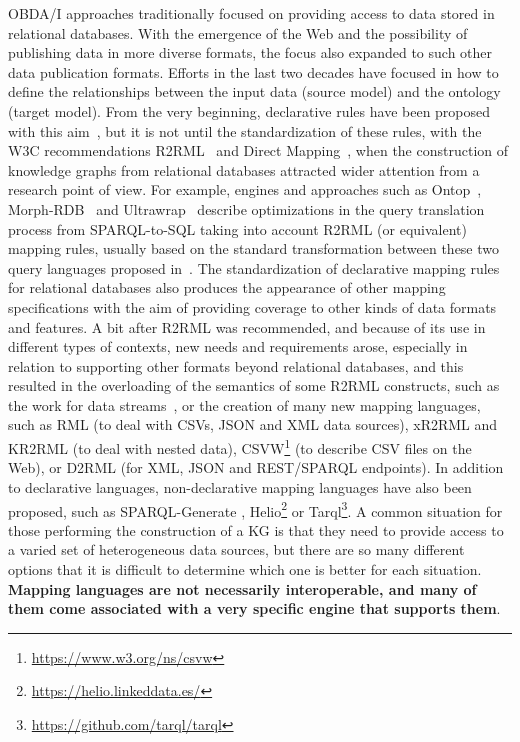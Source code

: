 OBDA/I approaches traditionally focused on providing access to data stored in relational databases. With the emergence of the Web and the possibility of publishing data in more diverse formats, the focus also expanded to such other data publication formats. Efforts in the last two decades have focused in how to define the relationships between the input data (source model) and the ontology (target model). From the very beginning, declarative rules have been proposed with this aim~\citep{barrasa2004r2o,bizer2004d2rq,auer2009triplify}, but it is not until the standardization of these rules, with the W3C recommendations R2RML~\citep{R2RML} and Direct Mapping~\citep{arenas2013direct}, when the construction of knowledge graphs from relational databases attracted wider attention from a research point of view. For example, engines and approaches such as Ontop~\citep{calvanese2017ontop}, Morph-RDB~\citep{priyatna2014formalisation} and Ultrawrap~\citep{sequeda2013ultrawrap} describe optimizations in the query translation process from SPARQL-to-SQL taking into account R2RML (or equivalent) mapping rules, usually based on the standard transformation between these two query languages proposed in~\citep{chebotko2009semantics, elliott2009complete}. The standardization of declarative mapping rules for relational databases also produces the appearance of other mapping specifications with the aim of providing coverage to other kinds of data formats and features. A bit after R2RML was recommended, and because of its use in different types of contexts, new needs and requirements arose, especially in relation to supporting other formats beyond relational databases, and this resulted in the overloading of the semantics of some R2RML constructs, such as the work for data streams~\citep{calbimonte2010enabling}, or the creation of many new mapping languages, such as RML \citep{dimou2014rml} (to deal with CSVs, JSON and XML data sources), xR2RML \citep{michel2015translation} and  KR2RML \citep{slepicka2015kr2rml} (to deal with nested data), CSVW\footnote{\url{https://www.w3.org/ns/csvw}} (to describe CSV files on the Web), or D2RML \citep{chortaras2018d2rml} (for XML, JSON and REST/SPARQL endpoints). In addition to declarative languages, non-declarative mapping languages have also been proposed, such as SPARQL-Generate \citep{lefranccois2017sparql}, Helio\footnote{\url{https://helio.linkeddata.es/}} or  Tarql\footnote{\url{https://github.com/tarql/tarql}}. A common situation for those performing the construction of a KG is that they need to provide access to a varied set of heterogeneous data sources, but there are so many different options that it is difficult to determine which one is better for each situation. \textbf{Mapping languages are not necessarily interoperable, and many of them come associated with a very specific engine that supports them}.

